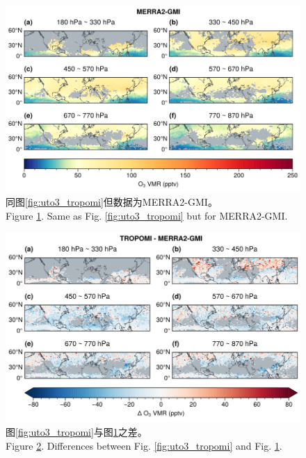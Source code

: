 \begin{figure}[H]
    \centering
    \includegraphics[width=16cm]{./figures/uto3_merra2-gmi.png}
    \caption{
    同图\ref{fig:uto3_tropomi}但数据为MERRA2-GMI。 \\
    Figure \ref{fig:uto3_merra2}. Same as Fig. \ref{fig:uto3_tropomi} but for MERRA2-GMI.
    }
    \label{fig:uto3_merra2}
\end{figure}


\begin{figure}[H]
    \centering
    \includegraphics[width=16cm]{./figures/uto3_delta.png}
    \caption{
    图\ref{fig:uto3_tropomi}与图\ref{fig:uto3_merra2}之差。 \\
    Figure \ref{fig:uto3_delta}. Differences between Fig. \ref{fig:uto3_tropomi} and Fig. \ref{fig:uto3_merra2}.
    }
    \label{fig:uto3_delta}
\end{figure}


